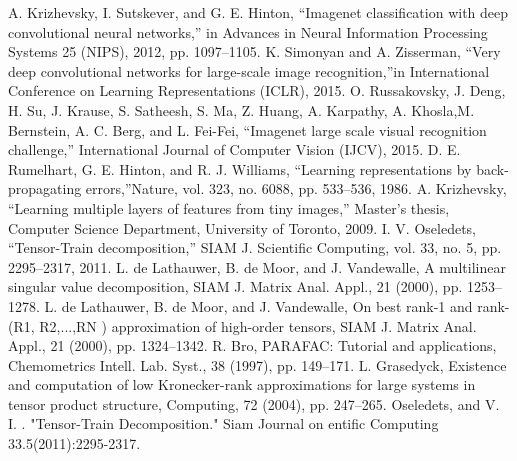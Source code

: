 \documentclass[onecolumn, conference]{IEEEtran}
\begin{document}

\begin{thebibliography}{00}
     A. Krizhevsky, I. Sutskever, and G. E. Hinton, “Imagenet classification with deep convolutional neural networks,” in Advances in Neural Information Processing Systems 25 (NIPS), 2012, pp. 1097–1105.
 K. Simonyan and A. Zisserman, “Very deep convolutional networks for large-scale image recognition,”in International Conference on Learning Representations (ICLR), 2015.
 O. Russakovsky, J. Deng, H. Su, J. Krause, S. Satheesh, S. Ma, Z. Huang, A. Karpathy, A. Khosla,M. Bernstein, A. C. Berg, and L. Fei-Fei, “Imagenet large scale visual recognition challenge,” International Journal of Computer Vision (IJCV), 2015.
 D. E. Rumelhart, G. E. Hinton, and R. J. Williams, “Learning representations by back-propagating errors,”Nature, vol. 323, no. 6088, pp. 533–536, 1986.
 A. Krizhevsky, “Learning multiple layers of features from tiny images,” Master’s thesis, Computer Science Department, University of Toronto, 2009.
 I. V. Oseledets, “Tensor-Train decomposition,” SIAM J. Scientific Computing, vol. 33, no. 5, pp. 2295–2317, 2011.
 L. de Lathauwer, B. de Moor, and J. Vandewalle, A multilinear singular value decomposition, SIAM J. Matrix Anal. Appl., 21 (2000), pp. 1253–1278.
 L. de Lathauwer, B. de Moor, and J. Vandewalle, On best rank-1 and rank-(R1, R2,...,RN ) approximation of high-order tensors, SIAM J. Matrix Anal. Appl., 21 (2000), pp. 1324–1342.
 R. Bro, PARAFAC: Tutorial and applications, Chemometrics Intell. Lab. Syst., 38 (1997), pp. 149–171.
 L. Grasedyck, Existence and computation of low Kronecker-rank approximations for large systems in tensor product structure, Computing, 72 (2004), pp. 247–265.
 Oseledets, and V. I. . "Tensor-Train Decomposition." Siam Journal on entific Computing 33.5(2011):2295-2317.
\end{thebibliography}
\end{document}
